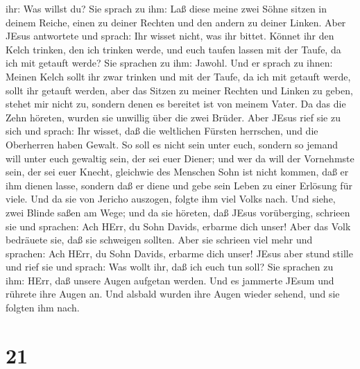 ihr: Was willst du? Sie sprach zu ihm: Laß diese meine zwei Söhne sitzen
in deinem Reiche, einen zu deiner Rechten und den andern zu deiner
Linken.  Aber JEsus antwortete und sprach: Ihr wisset
nicht, was ihr bittet. Könnet ihr den Kelch trinken, den ich trinken
werde, und euch taufen lassen mit der Taufe, da ich mit getauft werde?
Sie sprachen zu ihm: Jawohl.  Und er sprach zu ihnen:
Meinen Kelch sollt ihr zwar trinken und mit der Taufe, da ich mit
getauft werde, sollt ihr getauft werden, aber das Sitzen zu meiner
Rechten und Linken zu geben, stehet mir nicht zu, sondern denen es
bereitet ist von meinem Vater.  Da das die Zehn höreten,
wurden sie unwillig über die zwei Brüder.  Aber JEsus rief
sie zu sich und sprach: Ihr wisset, daß die weltlichen Fürsten
herrschen, und die Oberherren haben Gewalt.  So soll es
nicht sein unter euch, sondern so jemand will unter euch gewaltig sein,
der sei euer Diener;  und wer da will der Vornehmste sein,
der sei euer Knecht,  gleichwie des Menschen Sohn ist nicht
kommen, daß er ihm dienen lasse, sondern daß er diene und gebe sein
Leben zu einer Erlösung für viele.  Und da sie von Jericho
auszogen, folgte ihm viel Volks nach.  Und siehe, zwei
Blinde saßen am Wege; und da sie höreten, daß JEsus vorüberging,
schrieen sie und sprachen: Ach HErr, du Sohn Davids, erbarme dich unser!
 Aber das Volk bedräuete sie, daß sie schweigen sollten.
Aber sie schrieen viel mehr und sprachen: Ach HErr, du Sohn Davids,
erbarme dich unser!  JEsus aber stund stille und rief sie
und sprach: Was wollt ihr, daß ich euch tun soll?  Sie
sprachen zu ihm: HErr, daß unsere Augen aufgetan werden. 
Und es jammerte JEsum und rührete ihre Augen an. Und alsbald wurden ihre
Augen wieder sehend, und sie folgten ihm nach.

\hypertarget{section-20}{%
\section{21}\label{section-20}}

